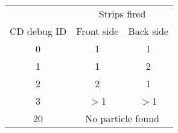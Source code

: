 \begin{tabular}{ccc}
\hline
             &  \multicolumn{2}{c}{Strips fired}       \\
CD debug ID  &  Front side &  Back side                \\
\hline
0            &     1       &     1                     \\
1            &     1       &     2                     \\
2            &     2       &     1                     \\
3            &  $>$1       &  $>$1                     \\
20           &  \multicolumn{2}{c}{No particle found}  \\
\hline
\end{tabular}